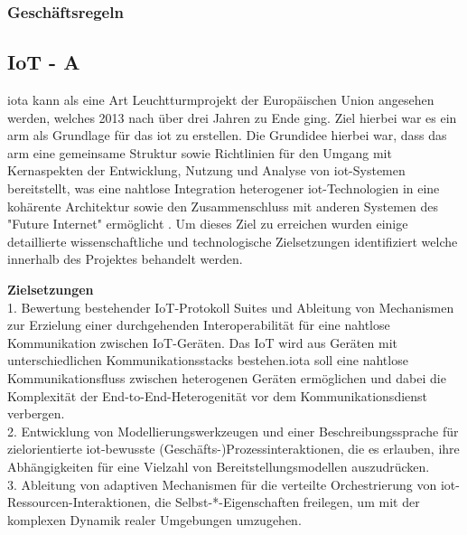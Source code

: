 \documentclass[a4paper, 12pt, twoside, headsepline=true]{scrartcl} %
\begin{document}
\subsubsection{Geschäftsregeln}



\subsection{IoT - A}

\acl{iota} kann als eine Art Leuchtturmprojekt der Europäischen Union angesehen werden, welches 2013 nach über drei Jahren zu Ende ging. Ziel hierbei war es ein \ac{arm} als Grundlage für das \ac{iot} zu erstellen. Die Grundidee hierbei war, dass das \ac{arm} eine gemeinsame Struktur sowie Richtlinien für den Umgang mit Kernaspekten der Entwicklung, Nutzung und Analyse von \ac{iot}-Systemen bereitstellt, was eine nahtlose Integration heterogener \ac{iot}-Technologien in eine kohärente Architektur sowie den Zusammenschluss mit anderen Systemen des "Future Internet" ermöglicht \cite[S.17]{enablingthingstotalk}. Um dieses Ziel zu erreichen wurden einige detaillierte wissenschaftliche und technologische Zielsetzungen identifiziert welche innerhalb des Projektes behandelt werden\cite{meetiot}.
\newline

\textbf{Zielsetzungen}
\\

1. Bewertung bestehender IoT-Protokoll Suites und Ableitung von Mechanismen zur Erzielung einer durchgehenden Interoperabilität für eine nahtlose Kommunikation zwischen IoT-Geräten. Das IoT wird aus Geräten mit unterschiedlichen Kommunikationsstacks bestehen.\ac{iota} soll eine nahtlose Kommunikationsfluss zwischen heterogenen Geräten ermöglichen und dabei die Komplexität der End-to-End-Heterogenität vor dem Kommunikationsdienst verbergen.
\\

2. Entwicklung von Modellierungswerkzeugen und einer Beschreibungssprache für zielorientierte \ac{iot}-bewusste (Geschäfts-)Prozessinteraktionen, die es erlauben, ihre Abhängigkeiten für eine Vielzahl von Bereitstellungsmodellen auszudrücken.
\\

3. Ableitung von adaptiven Mechanismen für die verteilte Orchestrierung von \ac{iot}-Ressourcen-Interaktionen, die Selbst-*-Eigenschaften freilegen, um mit der komplexen Dynamik realer Umgebungen umzugehen. 
\\
\end{document}
